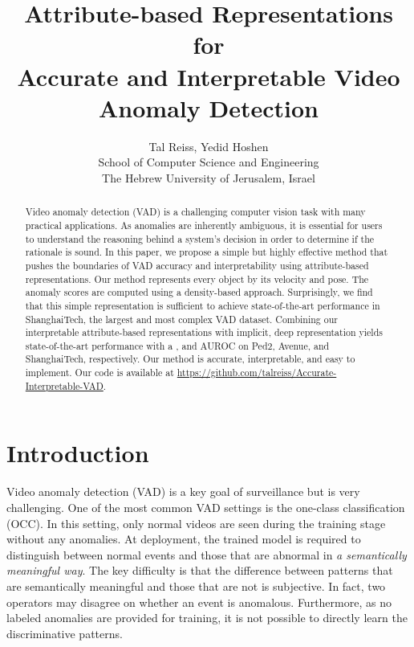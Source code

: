 \documentclass[10pt,twocolumn,letterpaper]{article}
\begin{document}
\title{Attribute-based Representations for\\ Accurate and Interpretable Video Anomaly Detection}


\author{Tal Reiss, Yedid Hoshen\\
School of Computer Science and Engineering\\
The Hebrew University of Jerusalem, Israel\\
}
\maketitle

\begin{abstract}
Video anomaly detection (VAD) is a challenging computer vision task with many practical applications. As anomalies are inherently ambiguous, it is essential for users to understand the reasoning behind a system's decision in order to determine if the rationale is sound. In this paper, we propose a simple but highly effective method that pushes the boundaries of VAD accuracy and interpretability using attribute-based representations. Our method represents every object by its velocity and pose. The anomaly scores are computed using a density-based approach. Surprisingly, we find that this simple representation is sufficient to achieve state-of-the-art performance in ShanghaiTech, the largest and most complex VAD dataset. Combining our interpretable attribute-based representations with implicit, deep representation yields state-of-the-art performance with a , and  AUROC on Ped2, Avenue, and ShanghaiTech, respectively. Our method is accurate, interpretable, and easy to implement. Our code is available at \url{https://github.com/talreiss/Accurate-Interpretable-VAD}.
\end{abstract}


\section{Introduction}
\label{sec:intro}
Video anomaly detection (VAD) is a key goal of surveillance but is very challenging. One of the most common VAD settings is the one-class classification (OCC). In this setting, only normal videos are seen during the training stage without any anomalies. At deployment, the trained model is required to distinguish between normal events and those that are abnormal in \textit{a semantically meaningful way}. The key difficulty is that the difference between patterns that are semantically meaningful and those that are not is subjective. In fact, two operators may disagree on whether an event is anomalous. Furthermore, as no labeled anomalies are provided for training, it is not possible to directly learn the discriminative patterns.
\end{document}
